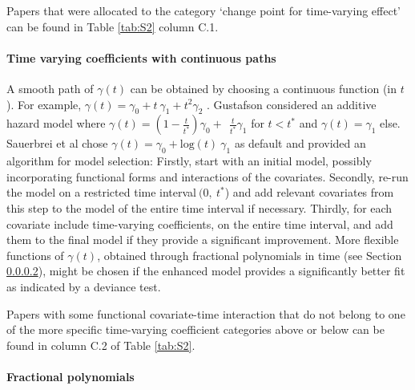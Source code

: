 \noindent Papers that were allocated to the category `change point for time-varying effect' can be found in Table \ref{tab:S2} column C.1.

\noindent 


\paragraph{Time varying coefficients with continuous paths} \label{timeXcovariate}

\noindent 


\noindent A smooth path of $\gamma \left(t\right)$ can be obtained by choosing a continuous function (in $t$). For example, $\gamma \left(t\right)={\gamma }_0+t\ {\gamma }_1+t^2{\gamma }_2$ \cite{Stablein.1980}. Gustafson \cite{Gustafson.1998} considered an additive hazard model where $\gamma \left(t\right)=\left(1-\frac{t}{t^*}\right){\gamma }_0+\ \ \frac{t}{t^*}{\gamma }_1$ for $t<t^*$ and $\gamma \left(t\right)={\gamma }_1$ else. Sauerbrei et al \cite{Sauerbrei.2007} chose $\gamma \left(t\right)={\gamma }_0+{\mathrm{log} \left(t\right)\ }{\gamma }_1$ as default and provided an algorithm for model selection: Firstly, start with an initial model, possibly incorporating functional forms and interactions of the covariates. Secondly, re-run the model on a restricted time interval$\ (0,\ t^*$) and add relevant covariates from this step to the model of the entire time interval if necessary. Thirdly, for each covariate include time-varying coefficients, on the entire time interval, and add them to the final model if they provide a significant improvement. More flexible functions of $\gamma \left(t\right)$, obtained through fractional polynomials in time (see Section \ref{fractional}), might be chosen if the enhanced model provides a significantly better fit as indicated by a deviance test.

\noindent Papers with some functional covariate-time interaction that do not belong to one of the more specific time-varying coefficient categories above or below can be found in column C.2 of Table \ref{tab:S2}. 

\noindent 


\paragraph{Fractional polynomials} \label{fractional}

\noindent 

